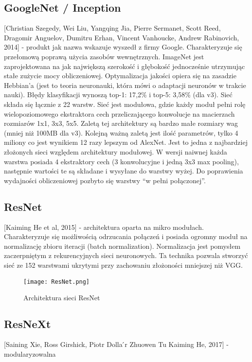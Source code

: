 \documentclass[a4paper,twoside,titlepage,openright]{book}
\begin{document}
\subsection{GoogleNet / Inception}
[Christian Szegedy, Wei Liu, Yangqing Jia, Pierre Sermanet, Scott Reed, Dragomir Anguelov, Dumitru Erhan, Vincent Vanhoucke, Andrew Rabinovich, 2014] - produkt jak nazwa wskazuje wyszedł z firmy Google. Charakteryzuje się przełomową poprawą użycia zasobów wewnętrznych. ImageNet jest zaprojektowana na jak największą szerokość i głębokość jednocześnie utrzymując stałe zużycie mocy obliczeniowej. Optymalizacja jakości opiera się na zasadzie Hebbian’a (jest to teoria neuronauki, która mówi o adaptacji neuronów w trakcie nauki). Błędy klasyfikacji wynoszą top-1: 17,2\% i top-5: 3,58\% (dla v3). Sieć składa się łącznie z 22 warstw. Sieć jest modułowa, gdzie każdy moduł pełni rolę wielopoziomowego ekstraktora cech przeliczającego konwolucje na macierzach rozmiarów 1x1, 3x3, 5x5. Zaletą tej architektury są bardzo małe rozmiary wag (mniej niż 100MB dla v3). Kolejną ważną zaletą jest ilość parametrów, tylko 4 miliony co jest wynikiem 12 razy lepszym od AlexNet. Jest to jedna z najbardziej złożonych sieci względem architektury modułowej. W wersji naiwnej każda warstwa posiada 4 ekstraktory cech (3 konwolucyjne i jedną 3x3 max pooling), następnie wartości te są składane i wysyłane do warstwy wyżej. Do poprawienia wydajności obliczeniowej pozbyto się warstwy “w pełni połączonej”.

\subsection{ResNet}
[Kaiming He et al, 2015]  - architektura oparta na mikro modułach. Charakteryzuje się możliwością odrzucania połączeń i posiada ogromny moduł na normalizację zbioru iteracji (batch normalization). Normalizacja jest pomysłem zaczerpniętym z rekurencyjnych sieci neuronowych. Ta technika pozwala stworzyć sieć ze 152 warstwami ukrytymi przy zachowaniu złożoności mniejszej niż VGG.

\begin{figure}[h]
	\centering
			\texttt{[image: ResNet.png]}
		\caption{Architektura sieci ResNet}
\end{figure}

\subsection{ResNeXt}
[Saining Xie, Ross Girshick, Piotr Dolla ́r Zhuowen Tu Kaiming He, 2017] - modularyzowalna 
\end{document}
